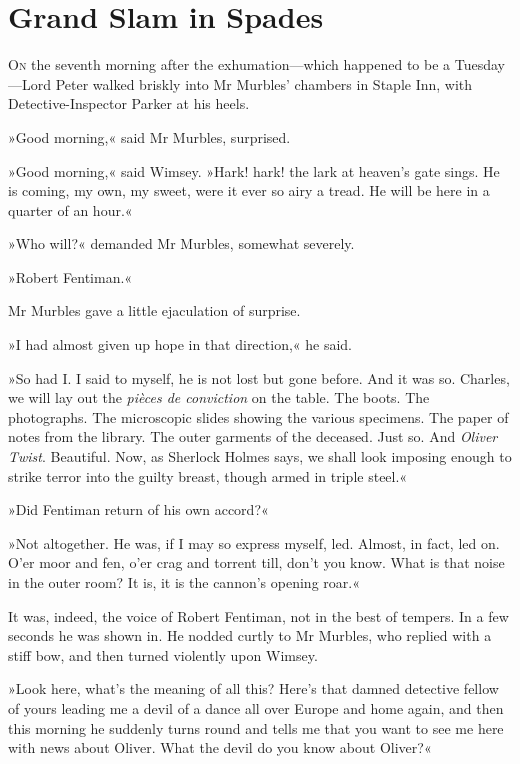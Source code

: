 \chapter{Grand Slam in Spades}

\lettrine[lines=4]{O}{n} the seventh morning after the exhumation—which happen\-ed to be a Tuesday—Lord Peter walked briskly into Mr Murb\-les' chambers in Staple Inn, with Detective-Inspector Parker at his heels.

\zz
»Good morning,« said Mr Murbles, surprised.

»Good morning,« said Wimsey. »Hark! hark! the lark at heaven's gate sings. He is coming, my own, my sweet, were it ever so airy a tread. He will be here in a quarter of an hour.«

»Who will?« demanded Mr Murbles, somewhat severely.

»Robert Fentiman.«

Mr Murbles gave a little ejaculation of surprise.

»I had almost given up hope in that direction,« he said.

»So had I. I said to myself, he is not lost but gone before. And it was so. Charles, we will lay out the \textit{pièces de conviction} on the table. The boots. The photographs. The microscopic slides showing the various specimens. The paper of notes from the library. The outer garments of the deceased. Just so. And \textit{Oliver Twist}. Beautiful. Now, as Sherlock Holmes says, we shall look imposing enough to strike terror into the guilty breast, though armed in triple steel.«

»Did Fentiman return of his own accord?«

»Not altogether. He was, if I may so express myself, led. Almost, in fact, led on. O'er moor and fen, o'er crag and torrent till, don't you know. What is that noise in the outer room? It is, it is the cannon's opening roar.«

It was, indeed, the voice of Robert Fentiman, not in the best of tempers. In a few seconds he was shown in. He nodded curtly to Mr Murbles, who replied with a stiff bow, and then turned violently upon Wimsey.

»Look here, what's the meaning of all this? Here's that damned detective fellow of yours leading me a devil of a dance all over Europe and home again, and then this morning he suddenly turns round and tells me that you want to see me here with news about Oliver. What the devil do you know about Oliver?«

